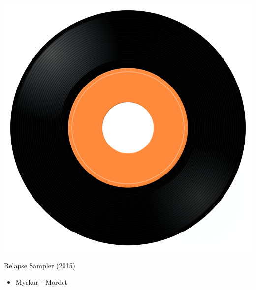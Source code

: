 \begin{minipage}[t]{0.25\textwidth}\vspace{0pt}
\captionsetup{type=figure}
\includegraphics[width=\textwidth]{Images/cover.png}
\caption*{Relapse Sampler (2015)}
\end{minipage}
\begin{minipage}[t]{0.25\textwidth}\vspace{0pt}
\begin{itemize}[nosep,leftmargin=1em,labelwidth=*,align=left]
	\setlength{\itemsep}{0pt}
	\item Myrkur - Mordet
\end{itemize}
\end{minipage}
